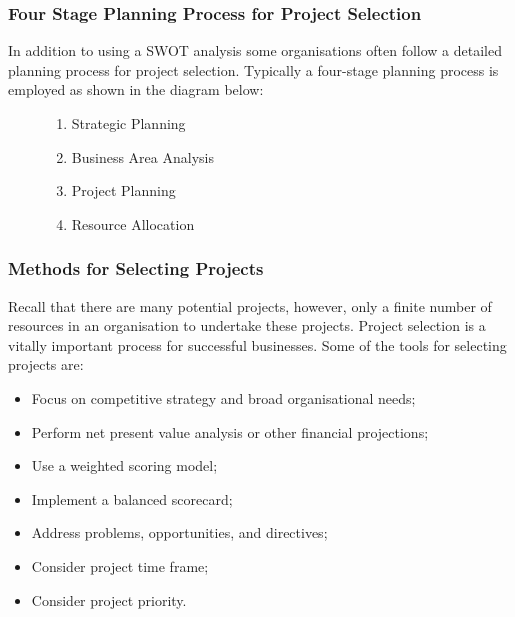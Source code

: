 \documentclass{beamer}
\begin{document}
\begin{frame}
\frametitle{Four Stage Planning Process for Project Selection}
In addition to using a SWOT analysis some organisations often follow a detailed planning process for project selection. Typically a four-stage planning process is employed as shown in the diagram below:
\vspace{0.5cm}
\begin{figure}
\begin{enumerate}
\item Strategic Planning
\item Business Area Analysis
\item Project Planning
\item Resource Allocation
\end{enumerate}
\end{figure}
\end{frame}
\begin{frame}
\frametitle{Methods for Selecting Projects}
Recall that there are many potential projects, however, only a finite number of resources in an organisation to undertake these projects. Project selection is a vitally important process for successful businesses. Some of the tools for selecting projects are:
\vspace{0.5cm}
\begin{itemize}
\item Focus on competitive strategy and broad organisational needs;
\item Perform net present value analysis or other financial projections;
\item Use a weighted scoring model;
\item Implement a balanced scorecard;
\item Address problems, opportunities, and directives;
\item Consider project time frame;
\item Consider project priority.
\end{itemize}
\end{frame}
\end{document}
